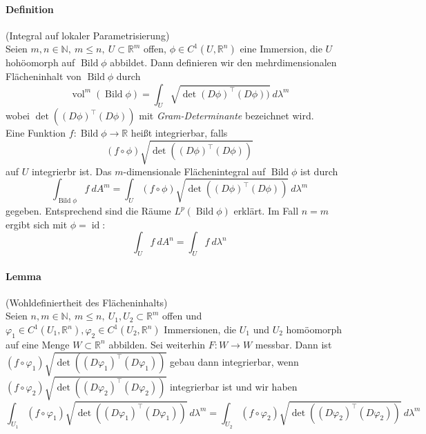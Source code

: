\documentclass[12pt,a4paper,fleqn]{article}
\def\R{{\mathbb{R}}}
\begin{document}
\paragraph{Definition} (Integral auf lokaler Parametrisierung)\\
Seien $m, n \in \mathbb{N},\ m \leq n,\ U \subset \R^m$ offen, $\phi \in C^1(U, \R^n)$ eine Immersion, die $U$ hohöomorph auf $\operatorname{Bild} \phi$ abbildet. Dann definieren wir den mehrdimensionalen Flächeninhalt von $\operatorname{Bild} \phi$ durch
\begin{displaymath}
\operatorname{vol}^m(\operatorname{Bild} \phi) = \int_U \sqrt{\det(D\phi)^\top(D\phi))}\ d\lambda^m
\end{displaymath}
wobei $\det ((D\phi)^\top(D\phi))$ mit \textit{Gram-Determinante} bezeichnet wird.\\
 Eine Funktion $f\colon \operatorname{Bild} \phi \rightarrow \R$ heißt integrierbar, falls
 \begin{displaymath}
 (f \circ \phi)\sqrt{\det((D\phi)^\top(D\phi))}
 \end{displaymath}
 auf $U$ integrierbr ist. Das $m$-dimensionale Flächenintegral auf $\operatorname{Bild}\phi$ ist durch 
 \begin{displaymath}
 \int_{\operatorname{Bild} \phi} f\ dA^m = \int_U (f \circ \phi)\sqrt{\det((D\phi)^\top(D\phi))}\ d\lambda^m
 \end{displaymath}
 gegeben. Entsprechend sind die Räume $L^p(\operatorname{Bild}\phi)$ erklärt.
 Im Fall $n = m$ ergibt sich mit $\phi = \operatorname{id}$:
 \begin{displaymath}
 \int_U f\ dA^n = \int_U f\ d\lambda^n
 \end{displaymath}
 
 \paragraph{Lemma} (Wohldefiniertheit des Flächeninhalts)\\
 Seien $n, m \in \mathbb{N},\ m \leq n,\ U_1, U_2 \subset \R^m$ offen und $\varphi_1 \in C^1(U_1, \R^n), \varphi_2 \in C^1(U_2, \R^n)$ Immersionen, die $U_1$ und $U_2$ homöomorph auf eine Menge $W\subset \R^n$ abbilden. Sei weiterhin $F\colon W \rightarrow W$ messbar. Dann ist $(f \circ \varphi_1)\sqrt{\det((D\varphi_1)^\top(D\varphi_1))}$ gebau dann integrierbar, wenn $(f \circ \varphi_2)\sqrt{\det((D\varphi_2)^\top(D\varphi_2))}$ integrierbar ist und wir haben
 \begin{displaymath}
 \int_{U_1} (f \circ \varphi_1)\sqrt{\det((D\varphi_1)^\top(D\varphi_1))}\ d\lambda^m = \int_{U_2} (f \circ \varphi_2)\sqrt{\det((D\varphi_2)^\top(D\varphi_2))}\ d\lambda^m
 \end{displaymath}
 
\end{document}
